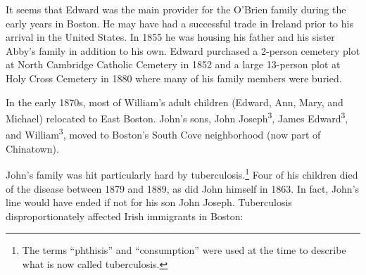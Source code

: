 It seems that Edward was the main provider for the O'Brien family during the early years in Boston. He may have had a successful trade in Ireland prior to his arrival in the United States. In 1855 he was housing his father and his sister Abby's family in addition to his own.\cite{Census1855William} Edward purchased a 2-person cemetery plot at North Cambridge Catholic Cemetery in 1852\cite{CarolGordon:1} and a large 13-person plot at Holy Cross Cemetery in 1880\cite{HolyCrossPlot} where many of his family members were buried.

In the early 1870s, most of William's adult children (Edward, Ann, Mary, and Michael) relocated to East Boston. John's sons, John Joseph\textsuperscript{3}, James Edward\textsuperscript{3}, and William\textsuperscript{3}, moved to Boston's South Cove neighborhood (now part of Chinatown).\cite{1870sAddresses}

John's family was hit particularly hard by tuberculosis.\footnote{The terms ``phthisis'' and ``consumption'' were used at the time to describe what is now called tuberculosis.\cite{TuberculosisHistory}} Four of his children died of the disease between 1879 and 1889, as did John himself in 1863.\cite{John2OBrienDeath} In fact, John's line would have ended if not for his son John Joseph. Tuberculosis disproportionately affected Irish immigrants in Boston:

